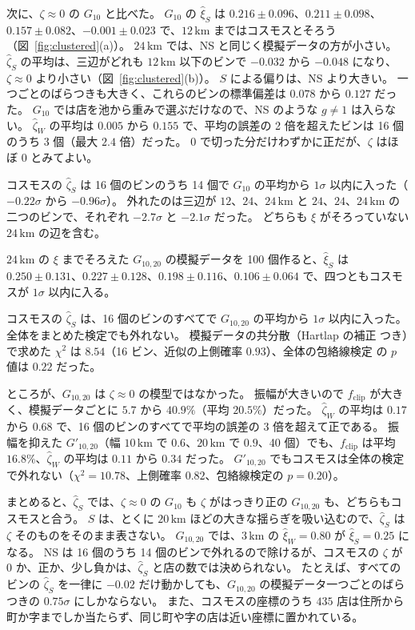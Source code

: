 \documentclass[a4paper,11pt]{ltjsarticle}
\begin{document}
次に、$\zeta \approx 0$ の $G_{10}$ と比べた。
$G_{10}$ の $\hat\xi_S$ は $0.216 \pm 0.096$、$0.211 \pm 0.098$、$0.157 \pm 0.082$、$-0.001 \pm 0.023$ で、$12\,\mathrm{km}$ まではコスモスとそろう（図~\ref{fig:clustered}(a)）。
$24\,\mathrm{km}$ では、NS と同じく模擬データの方が小さい。
$\hat\zeta_S$ の平均は、三辺がどれも $12\,\mathrm{km}$ 以下のビンで $-0.032$ から $-0.048$ になり、$\zeta \approx 0$ より小さい（図~\ref{fig:clustered}(b)）。
$S$ による偏りは、NS より大きい。
一つごとのばらつきも大きく、これらのビンの標準偏差は $0.078$ から $0.127$ だった。
$G_{10}$ では店を池から重みで選ぶだけなので、NS のような $g \ne 1$ は入らない。
$\hat\zeta_W$ の平均は $0.005$ から $0.155$ で、平均の誤差の 2 倍を超えたビンは 16 個のうち 3 個（最大 $2.4$ 倍）だった。
$0$ で切った分だけわずかに正だが、$\zeta$ はほぼ $0$ とみてよい。

コスモスの $\hat\zeta_S$ は 16 個のビンのうち 14 個で $G_{10}$ の平均から $1\sigma$ 以内に入った（$-0.22\sigma$ から $-0.96\sigma$）。
外れたのは三辺が $12$、$24$、$24\,\mathrm{km}$ と $24$、$24$、$24\,\mathrm{km}$ の二つのビンで、それぞれ $-2.7\sigma$ と $-2.1\sigma$ だった。
どちらも $\xi$ がそろっていない $24\,\mathrm{km}$ の辺を含む。

$24\,\mathrm{km}$ の $\xi$ までそろえた $G_{10,20}$ の模擬データを 100 個作ると、$\hat\xi_S$ は $0.250 \pm 0.131$、$0.227 \pm 0.128$、$0.198 \pm 0.116$、$0.106 \pm 0.064$ で、四つともコスモスが $1\sigma$ 以内に入る。

コスモスの $\hat\zeta_S$ は、16 個のビンのすべてで $G_{10,20}$ の平均から $1\sigma$ 以内に入った。
全体をまとめた検定でも外れない。
模擬データの共分散（Hartlap の補正 \cite{Hartlap2007} つき）で求めた $\chi^2$ は $8.54$（16 ビン、近似の上側確率 $0.93$）、全体の包絡線検定 \cite{Myllymaki2017} の $p$ 値は $0.22$ だった。

ところが、$G_{10,20}$ は $\zeta \approx 0$ の模型ではなかった。
振幅が大きいので $f_{\mathrm{clip}}$ が大きく、模擬データごとに $5.7$ から $40.9\%$（平均 $20.5\%$）だった。
$\hat\zeta_W$ の平均は $0.17$ から $0.68$ で、16 個のビンのすべてで平均の誤差の 3 倍を超えて正である。
振幅を抑えた $G'_{10,20}$（幅 $10\,\mathrm{km}$ で $0.6$、$20\,\mathrm{km}$ で $0.9$、40 個）でも、$f_{\mathrm{clip}}$ は平均 $16.8\%$、$\hat\zeta_W$ の平均は $0.11$ から $0.34$ だった。
$G'_{10,20}$ でもコスモスは全体の検定で外れない（$\chi^2 = 10.78$、上側確率 $0.82$、包絡線検定の $p = 0.20$）。

まとめると、$\hat\zeta_S$ では、$\zeta \approx 0$ の $G_{10}$ も $\zeta$ がはっきり正の $G_{10,20}$ も、どちらもコスモスと合う。
$S$ は、とくに $20\,\mathrm{km}$ ほどの大きな揺らぎを吸い込むので、$\hat\zeta_S$ は $\zeta$ そのものをそのまま表さない。
$G_{10,20}$ では、$3\,\mathrm{km}$ の $\hat\xi_W = 0.80$ が $\hat\xi_S = 0.25$ になる。
NS は 16 個のうち 14 個のビンで外れるので除けるが、コスモスの $\zeta$ が $0$ か、正か、少し負かは、$\hat\zeta_S$ と店の数では決められない。
たとえば、すべてのビンの $\hat\zeta_S$ を一律に $-0.02$ だけ動かしても、$G_{10,20}$ の模擬データ一つごとのばらつきの $0.75\sigma$ にしかならない。
また、コスモスの座標のうち $435$ 店は住所から町か字までしか当たらず、同じ町や字の店は近い座標に置かれている。
\end{document}
